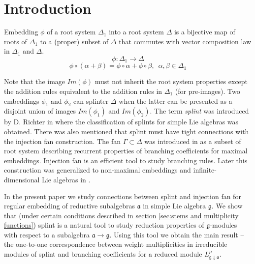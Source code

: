 \section{Introduction}
\label{sec:Introduction}

Embedding $\phi$ of a root system $\Delta_1$ into a root system
$\Delta$ is a bijective map of roots of $\Delta_{1}$ to a (proper)
subset of $\Delta$ that commutes with vector composition law in
$\Delta_{1}$ and $\Delta$.
\begin{equation*}
\phi:\Delta_1 \longrightarrow \Delta
\end{equation*}
\begin{equation*}
\phi \circ (\alpha + \beta) =\phi \circ \alpha + \phi \circ \beta,
\,\,\, \alpha,\beta \in \Delta_1
\end{equation*}

Note that the image $Im(\phi)$ must not inherit the root system
properties except the addition rules equivalent to the addition
rules in $\Delta_{1}$ (for pre-images). Two embeddings $\phi_1$ and $\phi_2$  
can splinter $\Delta$  when the latter can be presented 
as a disjoint union of images $Im(\phi_1)$ and $Im(\phi_2)$.   
The term {\it splint} was
introduced by D. Richter in  \cite{richter2008splints} where the
classification of splints for simple Lie algebras was obtained.
There was also mentioned that splint must have tight
connections with the injection fan construction. The fan $\Gamma
\subset \Delta$ was
introduced in \cite{lyakhovsky1996rra} as a subset of root system describing recurrent
properties of branching coefficients for maximal embeddings. Injection fan is an
efficient tool to study branching rules. Later this construction
was generalized to non-maximal embeddings and infinite-dimensional
Lie algebras in \cite{2010arXiv1007.0318L, ilyin812pbc}.

In the present paper we study connections between splint and
injection fan for regular embedding of reductive subalgebras
${\mathfrak a}$ in simple Lie algebra $\mathfrak{g}$. We show that (under
certain conditions described in section \ref{sec:stems and
multiplicity functions}) splint is a natural tool to study
reduction properties of ${\mathfrak g}$-modules
with respect to a subalgebra ${\mathfrak a}\longrightarrow
{\mathfrak g}$. Using this tool we obtain the main result -- the one-to-one correspondence between weight
multiplicities in irreducible modules of splint and branching
coefficients for a reduced module $L^{\mu}_{{\mathfrak
g}\downarrow {\mathfrak a}}$.


